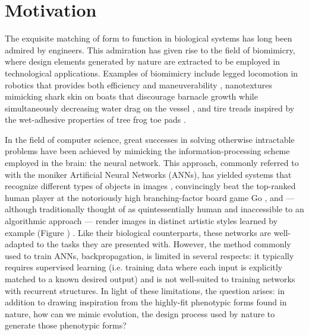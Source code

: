 \chapter{Motivation} \label{sec:motivation}
The exquisite matching of form to function in biological systems has long been admired by engineers. This admiration has given rise to the field of biomimicry, where design elements generated by nature are extracted to be employed in technological applications. Examples of biomimicry include legged locomotion in robotics that provides both efficiency and maneuverability \cite{Grimes2012THE}, nanotextures mimicking shark skin on boats that discourage barnacle growth while simultaneously decreasing water drag on the vessel \cite{Stenzel2011Drag-reducingShipping}, and tire treads inspired by the wet-adhesive properties of tree frog toe pads \cite{Persson2007WetTires}.

In the field of computer science, great successes in solving otherwise intractable problems have been achieved by mimicking the information-processing scheme employed in the brain: the neural network. This approach, commonly referred to with the moniker Artificial Neural Networks (ANNs), has yielded systems that recognize different types of objects in images \cite{KrizhevskyImageNetNetworks}, convincingly beat the top-ranked human player at the notoriously high branching-factor board game Go \cite{Silver2016MasteringSearch}, and --- although traditionally thought of as quintessentially human and inaccessible to an algorithmic approach --- render images in distinct artistic styles learned by example (Figure ) \cite{Gatys2015AStyle}. Like their biological counterparts, these networks are well-adapted to the tasks they are presented with. However, the method commonly used to train ANNs, backpropagation, is limited in several respects: it typically requires supervised learning (i.e. training data where each input is explicitly matched to a known desired output) and is not well-suited to training networks with recurrent structures. In light of these limitations, the question arises: in addition to drawing inspiration from the highly-fit phenotypic forms found in nature, how can we mimic evolution, the design process used by nature to generate those phenotypic forms?

